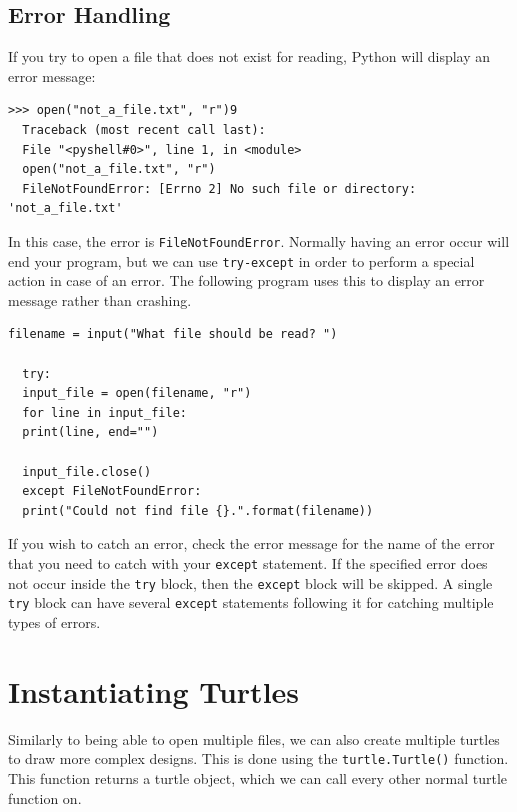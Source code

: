 \documentclass[11pt]{cselabheader}
\begin{document}
\subsection{Error Handling}
If you try to open a file that does not exist for reading, Python will display an error message:

\begin{lstlisting}[style=ipython]
  >>> open("not_a_file.txt", "r")9
  Traceback (most recent call last):
  File "<pyshell#0>", line 1, in <module>
  open("not_a_file.txt", "r")
  FileNotFoundError: [Errno 2] No such file or directory: 'not_a_file.txt'
\end{lstlisting}

In this case, the error is \lstinline{FileNotFoundError}. Normally having an error occur will end your program, but we can use \lstinline{try-except} in order to perform a special action in case of an error. The following program uses this to display an error message rather than crashing.

\begin{lstlisting}[style=python]
  filename = input("What file should be read? ")

  try:
  input_file = open(filename, "r")
  for line in input_file:
  print(line, end="")

  input_file.close()
  except FileNotFoundError:
  print("Could not find file {}.".format(filename))
\end{lstlisting}

If you wish to catch an error, check the error message for the name of the error that you need to catch with your \lstinline{except} statement. If the specified error does not occur inside the \lstinline{try} block, then the \lstinline{except} block will be skipped. A single \lstinline{try} block can have several \lstinline{except} statements following it for catching multiple types of errors.




\section{Instantiating Turtles}
Similarly to being able to open multiple files, we can also create multiple turtles to draw more complex designs. This is done using the \lstinline{turtle.Turtle()} function. This function returns a turtle object, which we can call every other normal turtle function on.
\end{document}
